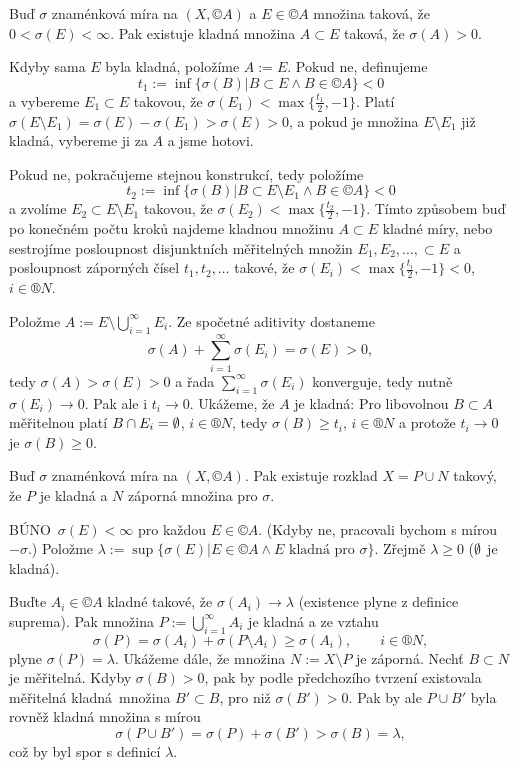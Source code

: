 \documentclass[12pt]{article}					%
\begin{document}
\begin{tvrzeni}
	Buď $\sigma$ znaménková míra na $(X, ©A)$ a $E \in ©A$ množina taková, že $0 < \sigma(E) < ∞$. Pak existuje kladná množina $A \subset E$ taková, že $\sigma(A) > 0$.

	\begin{dukazin}
		Kdyby sama $E$ byla kladná, položíme $A := E$. Pokud ne, definujeme
		$$ t_1 := \inf \{\sigma(B) | B \subset E \land B \in ©A\} < 0 $$
		a vybereme $E_1 \subset E$ takovou, že $\sigma(E_1) < \max \{\frac{t_1}{2}, -1\}$. Platí $\sigma(E \setminus E_1) = \sigma(E) - \sigma(E_1) > \sigma(E) > 0$, a pokud je množina $E \setminus E_1$ již kladná, vybereme ji za $A$ a jsme hotovi.

		Pokud ne, pokračujeme stejnou konstrukcí, tedy položíme
		$$ t_2 := \inf\{\sigma(B) | B \subset E \setminus E_1 \land B\in ©A\} < 0 $$
		a zvolíme $E_2 \subset E \setminus E_1$ takovou, že $\sigma(E_2) < \max\{\frac{t_2}{2}, -1\}$. Tímto způsobem buď po konečném počtu kroků najdeme kladnou množinu $A \subset E$ kladné míry, nebo sestrojíme posloupnost disjunktních měřitelných množin $E_1, E_2, …, \subset E$ a posloupnost záporných čísel $t_1, t_2, …$ takové, že $\sigma(E_i) < \max\{\frac{t_i}{2}, -1\} < 0$, $i \in ®N$.

		Položme $A := E \setminus \bigcup_{i=1}^∞ E_i$. Ze spočetné aditivity dostaneme
		$$ \sigma(A) + \sum_{i=1}^∞ \sigma(E_i) = \sigma(E) > 0, $$
		tedy $\sigma(A) > \sigma(E) > 0$ a řada $\sum_{i=1}^∞ \sigma(E_i)$ konverguje, tedy nutně $\sigma(E_i) \rightarrow 0$. Pak ale i $t_i \rightarrow 0$. Ukážeme, že $A$ je kladná: Pro libovolnou $B \subset A$ měřitelnou platí $B \cap E_i = \emptyset$, $i \in ®N$, tedy $\sigma(B) ≥ t_i$, $i \in ®N$ a protože $t_i \rightarrow 0$ je $\sigma(B) ≥ 0$.
	\end{dukazin}
\end{tvrzeni}

\begin{veta}
	Buď $\sigma$ znaménková míra na $(X, ©A)$. Pak existuje rozklad $X = P \cup N$ takový, že $P$ je kladná a $N$ záporná množina pro $\sigma$.

	\begin{dukazin}
		BÚNO $\sigma(E) < ∞$ pro každou $E \in ©A$. (Kdyby ne, pracovali bychom s mírou $-\sigma$.) Položme $\lambda := \sup\{\sigma(E) | E \in ©A \land E \text{ kladná pro } \sigma\}$. Zřejmě $\lambda ≥ 0$ ($\emptyset$ je kladná).

		Buďte $A_i \in ©A$ kladné takové, že $\sigma(A_i) \rightarrow \lambda$ (existence plyne z definice suprema). Pak množina $P := \bigcup_{i=1}^∞ A_i$ je kladná a ze vztahu
		$$ \sigma(P) = \sigma(A_i) + \sigma(P \setminus A_i) ≥ \sigma(A_i), \qquad i \in ®N, $$
		plyne $\sigma(P) = \lambda$. Ukážeme dále, že množina $N := X \setminus P$ je záporná. Nechť $B \subset N$ je měřitelná. Kdyby $\sigma(B) > 0$, pak by podle předchozího tvrzení existovala měřitelná kladná množina $B' \subset B$, pro niž $\sigma(B') > 0$. Pak by ale $P \cup B'$ byla rovněž kladná množina s mírou
		$$ \sigma(P \cup B') = \sigma(P) + \sigma(B') > \sigma(B) = \lambda, $$
		což by byl spor s definicí $\lambda$.
	\end{dukazin}
\end{veta}
\end{document}
